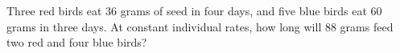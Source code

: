 Three red birds eat $ 36 $ grams of seed in four days, and five blue birds eat $ 60 $ grams in three days. At constant individual rates, how long will $ 88 $ grams feed two red and four blue birds?
